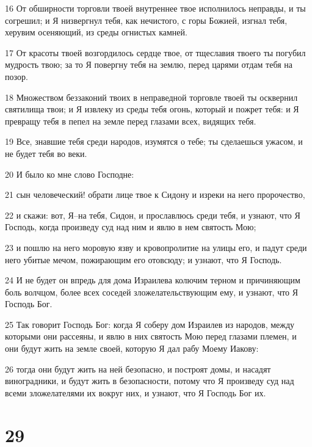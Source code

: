 \par 16 От обширности торговли твоей внутреннее твое исполнилось неправды, и ты согрешил; и Я низвергнул тебя, как нечистого, с горы Божией, изгнал тебя, херувим осеняющий, из среды огнистых камней.
\par 17 От красоты твоей возгордилось сердце твое, от тщеславия твоего ты погубил мудрость твою; за то Я повергну тебя на землю, перед царями отдам тебя на позор.
\par 18 Множеством беззаконий твоих в неправедной торговле твоей ты осквернил святилища твои; и Я извлеку из среды тебя огонь, который и пожрет тебя: и Я превращу тебя в пепел на земле перед глазами всех, видящих тебя.
\par 19 Все, знавшие тебя среди народов, изумятся о тебе; ты сделаешься ужасом, и не будет тебя во веки.
\par 20 И было ко мне слово Господне:
\par 21 сын человеческий! обрати лице твое к Сидону и изреки на него пророчество,
\par 22 и скажи: вот, Я--на тебя, Сидон, и прославлюсь среди тебя, и узнают, что Я Господь, когда произведу суд над ним и явлю в нем святость Мою;
\par 23 и пошлю на него моровую язву и кровопролитие на улицы его, и падут среди него убитые мечом, пожирающим его отовсюду; и узнают, что Я Господь.
\par 24 И не будет он впредь для дома Израилева колючим терном и причиняющим боль волчцом, более всех соседей зложелательствующим ему, и узнают, что Я Господь Бог.
\par 25 Так говорит Господь Бог: когда Я соберу дом Израилев из народов, между которыми они рассеяны, и явлю в них святость Мою перед глазами племен, и они будут жить на земле своей, которую Я дал рабу Моему Иакову:
\par 26 тогда они будут жить на ней безопасно, и построят домы, и насадят виноградники, и будут жить в безопасности, потому что Я произведу суд над всеми зложелателями их вокруг них, и узнают, что Я Господь Бог их.

\chapter{29}


